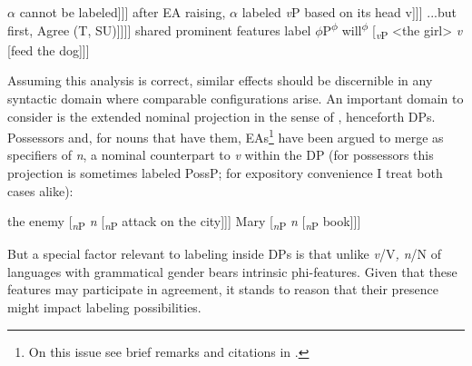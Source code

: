 \documentclass[output=paper
,modfonts
,nonflat]{langsci/langscibook}
\begin{document}
\begin{exe} 
\ex \label{ex-carstens:1} \xlist
	\ex \label{ex-carstens:1a} $\alpha$ cannot be labeled\newline
	[$\alpha$ [\textsubscript{DP} the girl] [\textsubscript{\textit{v}P } \textit{v} [\textsubscript{VP} feed [\textsubscript{DP} the dog]]]] 
	\ex \label{ex-carstens:1b}after EA raising, $\alpha$ labeled \textit{v}P  based on its head v\newline
	[\textsubscript{\textit{v}P } {\textless}the girl{\textgreater} [\textsubscript{\textit{v}P } \textit{v} [\textsubscript{VP} feed [\textsubscript{DP} the dog]]]] 
	\ex \label{ex-carstens:1c} ...but first, Agree (T, SU)\newline
	[T\textsubscript{u$\phi$} [\textsubscript{\textit{v}P } [\textsubscript{DP} the girl\textsubscript{$\phi$}] [\textsubscript{\textit{v}P } \textit{v} [\textsubscript{VP} feed [\textsubscript{DP} the dog]]]]] 
	\ex \label{ex-carstens:d}shared prominent features label $\phi$P\newline
	[\textsubscript{$\phi$P} [\textsubscript{DP} the girl]\textsuperscript{$\phi$} will\textsuperscript{$\phi$} [\textsubscript{\textit{v}P } <the girl> \textit{v} [feed the dog]]]  
\endxlist
\end{exe}
Assuming this analysis is correct, similar effects should be discernible in any syntactic domain where comparable configurations arise. An important domain to consider is the extended nominal projection in the sense of \citet{Grimshaw19912005}, henceforth DPs. Possessors and, for nouns that have them, EAs\footnote{On this issue see brief remarks and citations in .} have been argued to merge as specifiers of \textit{n}, a nominal counterpart to \textit{v} within the DP (for possessors this projection is sometimes labeled PossP; for expository convenience I treat both cases alike): 

\begin{exe}
\ex \label{ex-carstens:2}\xlist
	\ex {[\textsubscript{$\alpha$}} the enemy [\textsubscript{\textit{n}P} \textit{n} [\textsubscript{\textit{n}P} attack on the city]]]
	\ex {[\textsubscript{$\alpha$}} Mary [\textsubscript{\textit{n}P} \textit{n} [\textsubscript{\textit{n}P} book]]]
\endxlist
\end{exe}
But a special factor relevant to labeling inside DPs is that unlike \textit{v}/V\textit{, n}/N of languages with grammatical gender bears intrinsic phi-features. Given that these features may participate in agreement, it stands to reason that their presence might impact labeling possibilities.
\end{document}
